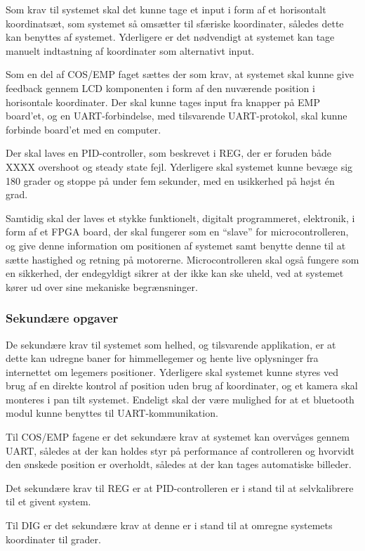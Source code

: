 Som krav til systemet skal det kunne tage et input i form af et horisontalt koordinatsæt, som systemet så omsætter til sfæriske koordinater, således dette kan benyttes af systemet. Yderligere er det nødvendigt at systemet kan tage manuelt indtastning af koordinater som alternativt input.

Som en del af COS/EMP faget sættes der som krav, at systemet skal kunne give feedback gennem LCD komponenten i form af den nuværende position i horisontale koordinater. Der skal kunne tages input fra knapper på EMP board'et, og en UART-forbindelse, med tilsvarende UART-protokol, skal kunne forbinde board'et med en computer.

Der skal laves en PID-controller, som beskrevet i REG, der er foruden både XXXX overshoot og steady state fejl. Yderligere skal systemet kunne bevæge sig 180 grader og stoppe på under fem sekunder, med en usikkerhed på højst én grad.

Samtidig skal der laves et stykke funktionelt, digitalt programmeret, elektronik, i form af et FPGA board, der skal fungerer som en ``slave'' for microcontrolleren, og give denne information om positionen af systemet samt benytte denne til at sætte hastighed og retning på motorerne. Microcontrolleren skal også fungere som en sikkerhed, der endegyldigt sikrer at der ikke kan ske uheld, ved at systemet kører ud over sine mekaniske begrænsninger.

\subsubsection{Sekundære opgaver}

De sekundære krav til systemet som helhed, og tilsvarende applikation, er at dette kan udregne baner for himmellegemer og hente live oplysninger fra internettet om legemers positioner. Yderligere skal systemet kunne styres ved brug af en direkte kontrol af position uden brug af koordinater, og et kamera skal monteres i pan tilt systemet. Endeligt skal der være mulighed for at et bluetooth modul kunne benyttes til UART-kommunikation.

Til COS/EMP fagene er det sekundære krav at systemet kan overvåges gennem UART, således at der kan holdes styr på performance af controlleren og hvorvidt den ønskede position er overholdt, således at der kan tages automatiske billeder.

Det sekundære krav til REG er at PID-controlleren er i stand til at selvkalibrere til et givent system.

Til DIG er det sekundære krav at denne er i stand til at omregne systemets koordinater til grader.